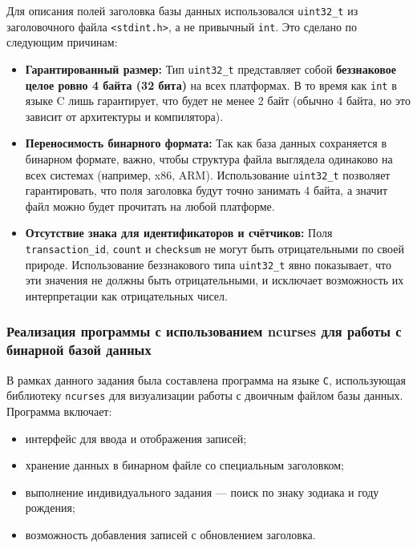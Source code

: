 Для описания полей заголовка базы данных использовался \texttt{uint32\_t} из заголовочного файла \texttt{<stdint.h>}, а не привычный \texttt{int}. Это сделано по следующим причинам:

\begin{itemize}
  \item \textbf{Гарантированный размер:} 
  Тип \texttt{uint32\_t} представляет собой \textbf{беззнаковое целое ровно 4 байта (32 бита)} на всех платформах. В то время как \texttt{int} в языке C лишь гарантирует, что будет не менее 2 байт (обычно 4 байта, но это зависит от архитектуры и компилятора).

  \item \textbf{Переносимость бинарного формата:}
  Так как база данных сохраняется в бинарном формате, важно, чтобы структура файла выглядела одинаково на всех системах (например, x86, ARM). Использование \texttt{uint32\_t} позволяет гарантировать, что поля заголовка будут точно занимать 4 байта, а значит файл можно будет прочитать на любой платформе.

  \item \textbf{Отсутствие знака для идентификаторов и счётчиков:}
  Поля \texttt{transaction\_id}, \texttt{count} и \texttt{checksum} не могут быть отрицательными по своей природе. Использование беззнакового типа \texttt{uint32\_t} явно показывает, что эти значения не должны быть отрицательными, и исключает возможность их интерпретации как отрицательных чисел.
\end{itemize}

\subsubsection{Реализация программы с использованием ncurses для работы с бинарной базой данных}

В рамках данного задания была составлена программа на языке \texttt{C}, использующая библиотеку \texttt{ncurses} для визуализации работы с двоичным файлом базы данных. Программа включает:

\begin{itemize}
    \item интерфейс для ввода и отображения записей;
    \item хранение данных в бинарном файле со специальным заголовком;
    \item выполнение индивидуального задания --- поиск по знаку зодиака и году рождения;
    \item возможность добавления записей с обновлением заголовка.
\end{itemize}


